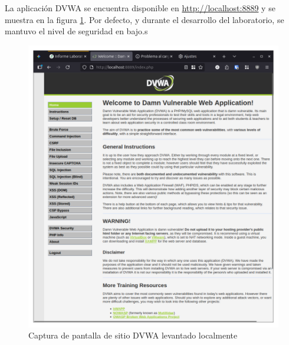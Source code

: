 \documentclass[letterpaper,12pt]{article}
\begin{document}
La aplicación DVWA se encuentra disponible en \url{http://localhost:8889} y se muestra en la figura \ref{fig:dvwastartscreen}. Por defecto, y durante el desarrollo del laboratorio, se mantuvo el nivel de seguridad en bajo.s
\begin{figure}
    \centering
    \includegraphics[width=1\linewidth]{levanteyredireccione/Captura desde 2025-10-01 23-14-34.png}
    \caption{Captura de pantalla de sitio DVWA levantado localmente}
    \label{fig:dvwastartscreen}
\end{figure}
\end{document}
